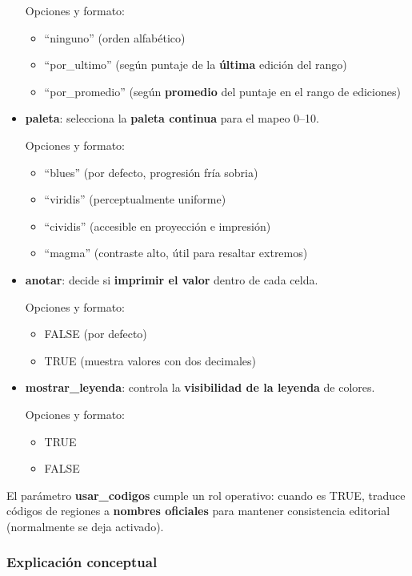 \documentclass[
  11pt,
  letterpaper,
  DIV=11,
  numbers=noendperiod]{scrartcl}
\begin{document}
\begin{itemize}
  Opciones y formato:

  \begin{itemize}
  \item
    ``ninguno'' (orden alfabético)
  \item
    ``por\_ultimo'' (según puntaje de la \textbf{última} edición del
    rango)
  \item
    ``por\_promedio'' (según \textbf{promedio} del puntaje en el rango
    de ediciones)
  \end{itemize}
\item
  \textbf{paleta}: selecciona la \textbf{paleta continua} para el mapeo
  0--10.

  Opciones y formato:

  \begin{itemize}
  \item
    ``blues'' (por defecto, progresión fría sobria)
  \item
    ``viridis'' (perceptualmente uniforme)
  \item
    ``cividis'' (accesible en proyección e impresión)
  \item
    ``magma'' (contraste alto, útil para resaltar extremos)
  \end{itemize}
\item
  \textbf{anotar}: decide si \textbf{imprimir el valor} dentro de cada
  celda.

  Opciones y formato:

  \begin{itemize}
  \item
    FALSE (por defecto)
  \item
    TRUE (muestra valores con dos decimales)
  \end{itemize}
\item
  \textbf{mostrar\_leyenda}: controla la \textbf{visibilidad de la
  leyenda} de colores.

  Opciones y formato:

  \begin{itemize}
  \item
    TRUE
  \item
    FALSE
  \end{itemize}
\end{itemize}

El parámetro \textbf{usar\_codigos} cumple un rol operativo: cuando es
TRUE, traduce códigos de regiones a \textbf{nombres oficiales} para
mantener consistencia editorial (normalmente se deja activado).

\subsubsection{\texorpdfstring{\textbf{Explicación
conceptual}}{Explicación conceptual}}\label{explicaciuxf3n-conceptual-4}
\end{document}
